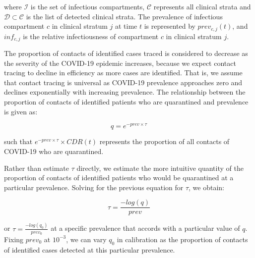 where $\mathcal{I}$ is the set of infectious compartments, $\mathcal{C}$ represents all clinical strata and $\mathcal{D} \subset \mathcal{C}$ is the list of detected clinical strata.
The prevalence of infectious compartment $c$ in clinical stratum $j$ at time $t$ is represented by $prev_{c,j}(t)$, and $inf_{c, j}$ is the relative infectiousness of compartment $c$ in clinical stratum $j$.

The proportion of contacts of identified cases traced is considered to decrease as the severity of the COVID-19 epidemic increases, because we expect contact tracing to decline in efficiency as more cases are identified.
That is, we assume that contact tracing is universal as COVID-19 prevalence approaches zero and declines exponentially with increasing prevalence.
The relationship between the proportion of contacts of identified patients who are quarantined and prevalence is given as:

\[q = e^{-prev \times \tau }\]

such that \(e^{-prev \times \tau} \times CDR(t) \) represents the proportion of all contacts of COVID-19 who are quarantined.

Rather than estimate \(\tau\) directly, we estimate the more intuitive quantity of the proportion of contacts of identified patients who would be quarantined at a particular prevalence.
Solving for the previous equation for \(\tau\), we obtain:

\[\tau = \frac{-log(q)}{prev} \]

or \(\tau = \frac{-log(q_{0})}{prev_{0}} \) at a specific prevalence that accords with a particular value of \(q\). Fixing \(prev_{0}\) at \(10^{-3}\), we can vary \(q_{0}\) in calibration as the proportion of contacts of identified cases detected at this particular prevalence.
